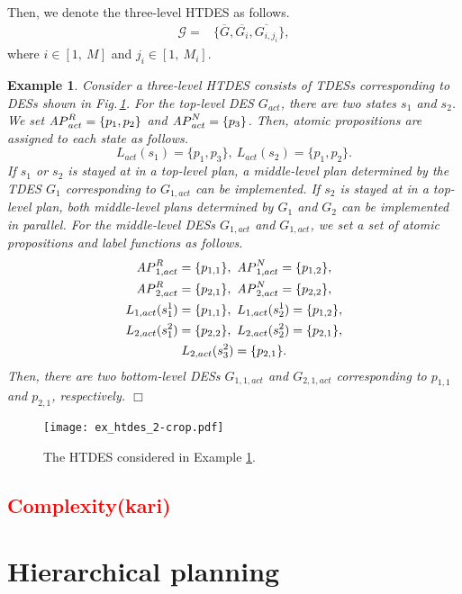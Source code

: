 \documentclass[journal,twoside,web]{IEEEtran}
\newcommand{\qedwhite}{\hfill \ensuremath{\Box}}
\newtheorem{exa}{Example}
\newcommand{\rfig}[1]{Fig.\,\ref{#1}}
\newcommand{\AP}{{\textit AP}}
\newcommand{\red}[1]{\textcolor{red}{#1}}
\begin{document}
%
%
Then, we denote the three-level HTDES as follows. 
%
\begin{align}\label{htdes}
\mathcal{G}
=&\{\overline{G}, \overline{G_i}, \overline{G_{i,{j_i}}} \},
\end{align}
where $i\in[1,\ M]$ and $j_i\in[1,\ M_i]$.
%
%
\begin{exa}\label{exa:hier}
Consider a three-level HTDES consists of TDESs corresponding to DESs shown in \rfig{ex:htdes}.
For the top-level DES $G_{act}$, there are two states $s_1$ and $s_2$.
We set $\AP^R_{act}=\{p_1,p_2\}$ and $\AP^N_{act}=\{p_3\}$. Then, atomic propositions are assigned to each state as follows.
\[
L_{act}(s_{1}) = \{p_1,p_3\},~
L_{act}(s_{2}) = \{p_1,p_2\}.
\]
If $s_1$ or $s_2$ is stayed at in a top-level plan, a middle-level plan determined by the TDES $G_1$ corresponding to $G_{1,act}$ can be implemented.
If $s_2$ is stayed at in a top-level plan, both middle-level plans determined by $G_1$ and $G_2$ can be implemented in parallel.
For the middle-level DESs $G_{1,act}$ and $G_{1,act}$, we set a set of atomic propositions and label functions as follows. 
\begin{gather}
\AP^R_{1,act}=\{p_{1,1}\},~\AP^N_{1,act}=\{p_{1,2}\},
\notag\\
\AP^R_{2,act}=\{p_{2,1}\},~\AP^N_{2,act}=\{p_{2,2}\},
\notag\\
L_{1,act}(s_{1}^1) = \{p_{1,1}\},~
L_{1,act}(s_{2}^1) = \{p_{1,2}\},
\notag\\
L_{2,act}(s_{1}^2) = \{p_{2,2}\},~
L_{2,act}(s_{2}^2) = \{p_{2,1}\},
\notag\\
L_{2,act}(s_{3}^2) = \{p_{2,1}\}.\notag
\end{gather}
Then, there are two bottom-level DESs $G_{1,1,act}$ and $G_{2,1,act}$ corresponding to $p_{1,1}$ and $p_{2,1}$, respectively.
\qedwhite
\end{exa}
%
\begin{figure}
\centering
\texttt{[image: ex\_htdes\_2-crop.pdf]}
\caption{The HTDES considered in Example \ref{exa:hier}.}
\label{ex:htdes}
\end{figure}
%
%
%
\red{\subsection{Complexity(kari)}}
%
%
%

%
\section{Hierarchical planning}\label{sec:hplan}
%
\end{document}
